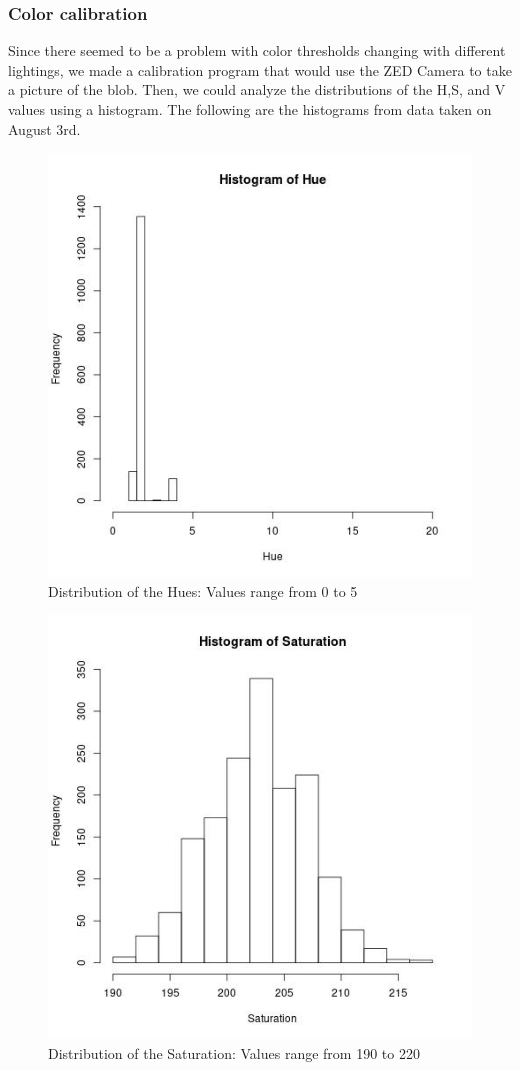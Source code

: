 \documentclass[journal, a4paper]{IEEEtran}
\begin{document}
\subsubsection{Color calibration}
Since there seemed to be a problem with color thresholds changing with different lightings, we made a calibration program that would use the ZED Camera to take a picture of the blob. Then, we could analyze the distributions of the H,S, and V values using a histogram. The following are the histograms from data taken on August 3rd. \\
\begin{figure}[H]
\includegraphics[scale=.50]{hplot.jpg}
\caption{Distribution of the Hues: Values range from 0 to 5}
\end{figure}
\begin{figure}[H]
\includegraphics[scale=.50]{splot.jpg}
\caption{Distribution of the Saturation: Values range from 190 to 220}
\end{figure}
\end{document}
